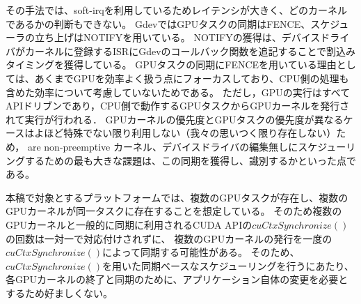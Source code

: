 
その手法では、soft-irqを利用しているためレイテンシが大きく、どのカーネルであるかの判断もできない。
GdevではGPUタスクの同期はFENCE、スケジューラの立ち上げはNOTIFYを用いている。
NOTIFYの獲得は、デバイスドライバがカーネルに登録するISRにGdevのコールバック関数を追記することで割込みタイミングを獲得している。
GPUタスクの同期にFENCEを用いている理由としては、あくまでGPUを効率よく扱う点にフォーカスしており、CPU側の処理も含めた効率について考慮していないためである。
ただし，GPUの実行はすべてAPIドリブンであり，CPU側で動作するGPUタスクからGPUカーネルを発行されて実行が行われる．
GPUカーネルの優先度とGPUタスクの優先度が異なるケースはよほど特殊でない限り利用しない（我々の思いつく限り存在しない）ため，
are non-preemptive
カーネル、デバイスドライバの編集無しにスケジューリングするための最も大きな課題は、この同期を獲得し、識別するかといった点である。
\fi

本稿で対象とするプラットフォームでは、複数のGPUタスクが存在し、複数のGPUカーネルが同一タスクに存在することを想定している。
そのため複数のGPUカーネルと一般的に同期に利用されるCUDA APIの$cuCtxSynchronize()$の回数は一対一で対応付けされずに、
複数のGPUカーネルの発行を一度の$cuCtxSynchronize()$によって同期する可能性がある。
そのため、$cuCtxSynchronize()$を用いた同期ベースなスケジューリングを行うにあたり、各GPUカーネルの終了と同期のために、アプリケーション自体の変更を必要とするため好ましくない。


